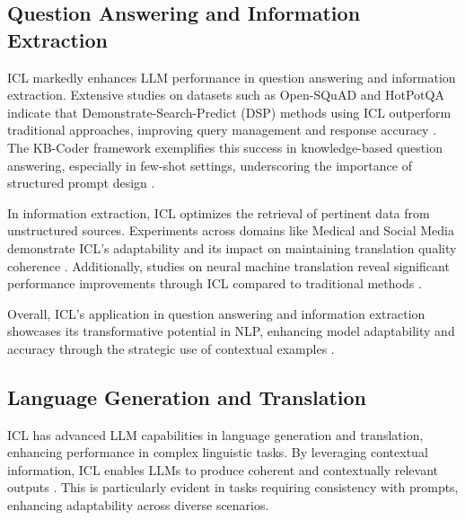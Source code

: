 \subsection{Question Answering and Information Extraction} \label{subsec:Question Answering and Information Extraction}

ICL markedly enhances LLM performance in question answering and information extraction. Extensive studies on datasets such as Open-SQuAD and HotPotQA indicate that Demonstrate-Search-Predict (DSP) methods using ICL outperform traditional approaches, improving query management and response accuracy \cite{khattab2023demonstratesearchpredictcomposingretrievallanguage}. The KB-Coder framework exemplifies this success in knowledge-based question answering, especially in few-shot settings, underscoring the importance of structured prompt design \cite{nie2024code}.

In information extraction, ICL optimizes the retrieval of pertinent data from unstructured sources. Experiments across domains like Medical and Social Media demonstrate ICL's adaptability and its impact on maintaining translation quality coherence \cite{sia2023incontextlearningmaintainingcoherency}. Additionally, studies on neural machine translation reveal significant performance improvements through ICL compared to traditional methods \cite{reinauer2023neuralmachinetranslationmodels}.

Overall, ICL's application in question answering and information extraction showcases its transformative potential in NLP, enhancing model adaptability and accuracy through the strategic use of contextual examples \cite{mo2024ciclcontrastiveincontextlearning,zhou2024mysteryincontextlearningcomprehensive,parry2024incontextlearningori,sheng2024unifiedincontextvisualunderstanding,dong2024surveyincontextlearning}.

\subsection{Language Generation and Translation} \label{subsec:Language Generation and Translation}

ICL has advanced LLM capabilities in language generation and translation, enhancing performance in complex linguistic tasks. By leveraging contextual information, ICL enables LLMs to produce coherent and contextually relevant outputs \cite{mo2024ciclcontrastiveincontextlearning,gao2024noiserobustnessincontextlearning,zhou2024mysteryincontextlearningcomprehensive,zhang2024improvingdiversitycommonsensegeneration}. This is particularly evident in tasks requiring consistency with prompts, enhancing adaptability across diverse scenarios.


